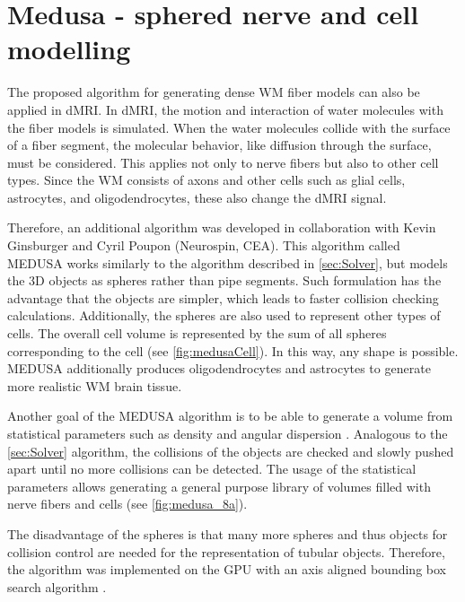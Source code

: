 \section{Medusa - sphered nerve and cell modelling}
\label{sec:medusa}
%
The proposed algorithm for generating dense \ac{WM} fiber models can also be applied in \ac{dMRI}.
In \ac{dMRI}, the motion and interaction of water molecules with the fiber models is simulated.
When the water molecules collide with the surface of a fiber segment, the molecular behavior, like diffusion through the surface, must be considered.
This applies not only to nerve fibers but also to other cell types.
Since the WM consists of axons and other cells such as glial cells, astrocytes, and oligodendrocytes, these also change the \ac{dMRI} signal.
\par
% 
Therefore, an additional algorithm was developed in collaboration with Kevin Ginsburger and Cyril Poupon (Neurospin, \ac{CEA}).
This algorithm called \ac{MEDUSA} \cite{Ginsburger2019} works similarly to the algorithm described in \cref{sec:Solver}, but models the 3D objects as spheres rather than pipe segments.
Such formulation has the advantage that the objects are simpler,
which leads to faster collision checking calculations.
Additionally, the spheres are also used to represent other types of cells.
The overall cell volume is represented by the sum of all spheres corresponding to the cell (see \cref{fig:medusaCell}).
In this way, any shape is possible.
\ac{MEDUSA} additionally produces oligodendrocytes and astrocytes to generate more realistic \ac{WM} brain tissue.
\par
% 
Another goal of the \ac{MEDUSA} algorithm is to be able to generate a volume from statistical parameters such as density and angular dispersion \cite{Ginsburger2019, ginsburgerDis2019}.
Analogous to the \cref{sec:Solver} algorithm, the collisions of the objects are checked and slowly pushed apart until no more collisions can be detected.
The usage of the statistical parameters allows generating a general purpose library of volumes filled with nerve fibers and cells (see \cref{fig:medusa_8a}).
\par
% 
The disadvantage of the spheres is that many more spheres and thus objects for collision control are needed for the representation of tubular objects.
Therefore, the algorithm was implemented on the \ac{GPU} with an axis aligned bounding box search algorithm \cite{Karras2012}.
% 
% 
%

